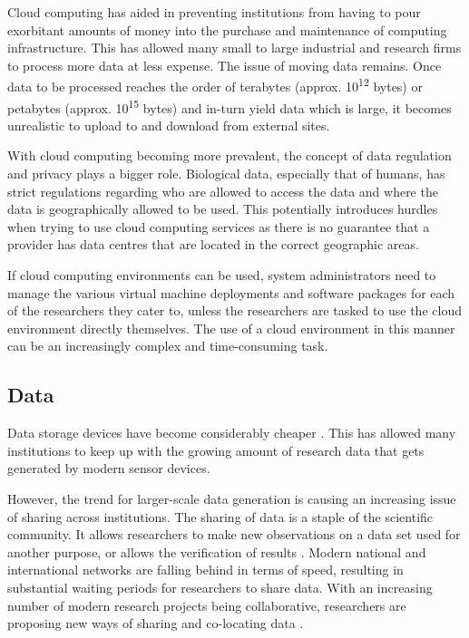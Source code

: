 Cloud computing has aided in preventing institutions from having to pour exorbitant amounts of money into the purchase and maintenance of computing infrastructure. This has allowed many small to large industrial and research firms to process more data at less expense. The issue of moving data remains. Once data to be processed reaches the order of terabytes (approx. 10\textsuperscript{12} bytes) or petabytes (approx. 10\textsuperscript{15} bytes) and in-turn yield data which is large, it becomes unrealistic to upload to and download from external sites.

With cloud computing becoming more prevalent, the concept of data regulation and privacy plays a bigger role. Biological data, especially that of humans, has strict regulations regarding who are allowed to access the data and where the data is geographically allowed to be used. This potentially introduces hurdles when trying to use cloud computing services as there is no guarantee that a provider has data centres that are located in the correct geographic areas.

If cloud computing environments can be used, system administrators need to manage the various virtual machine deployments and software packages for each of the researchers they cater to, unless the researchers are tasked to use the cloud environment directly themselves. The use of a cloud environment in this manner can be an increasingly complex and time-consuming task.


\subsection{Data}

Data storage devices have become considerably cheaper \parencite{backblaze}. This has allowed many institutions to keep up with the growing amount of research data that gets generated by modern sensor devices.

However, the trend for larger-scale data generation is causing an increasing issue of sharing across institutions. The sharing of data is a staple of the scientific community. It allows researchers to make new observations on a data set used for another purpose, or allows the verification of results \parencite{birnholtz2003data}. Modern national and international networks are falling behind in terms of speed, resulting in substantial waiting periods for researchers to share data. With an increasing number of modern research projects being collaborative, researchers are proposing new ways of sharing and co-locating data \citep{foster2003virtual,zhao2006virtual,pavlo2009comparison,winter2007electronic}.

